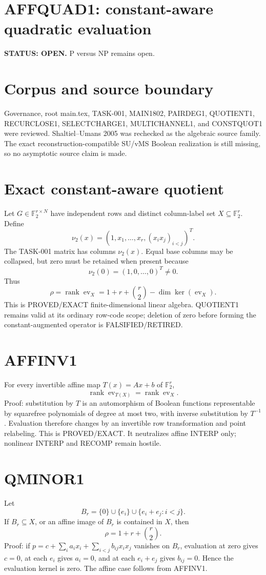 \documentclass{article}
\begin{document}
\section*{AFFQUAD1: constant-aware quadratic evaluation}
\textbf{STATUS: OPEN.} P versus NP remains open.

\section*{Corpus and source boundary}
Governance, root main.tex, TASK-001, MAIN1802, PAIRDEG1, QUOTIENT1, RECURCLOSE1, SELECTCHARGE1, MULTICHANNEL1, and CONSTQUOT1 were reviewed. Shaltiel--Umans 2005 was rechecked as the algebraic source family. The exact reconstruction-compatible SU/vMS Boolean realization is still missing, so no asymptotic source claim is made.

\section*{Exact constant-aware quotient}
Let \(G\in\mathbb F_2^{r\times N}\) have independent rows and distinct column-label set \(X\subseteq\mathbb F_2^r\). Define
\[
\nu_2(x)=(1,x_1,\ldots,x_r,(x_ix_j)_{i<j})^T.
\]
The TASK-001 matrix has columns \(\nu_2(x)\). Equal base columns may be collapsed, but zero must be retained when present because
\[
\nu_2(0)=(1,0,\ldots,0)^T\ne0.
\]
Thus
\[
\rho=\operatorname{rank}\operatorname{ev}_X
=1+r+\binom r2-\dim\ker(\operatorname{ev}_X).
\]
This is PROVED/EXACT finite-dimensional linear algebra. QUOTIENT1 remains valid at its ordinary row-code scope; deletion of zero before forming the constant-augmented operator is FALSIFIED/RETIRED.

\section*{AFFINV1}
For every invertible affine map \(T(x)=Ax+b\) of \(\mathbb F_2^r\),
\[
\boxed{\operatorname{rank}\operatorname{ev}_{T(X)}
=\operatorname{rank}\operatorname{ev}_X.}
\]
Proof: substitution by \(T\) is an automorphism of Boolean functions representable by squarefree polynomials of degree at most two, with inverse substitution by \(T^{-1}\). Evaluation therefore changes by an invertible row transformation and point relabeling. This is PROVED/EXACT. It neutralizes affine INTERP only; nonlinear INTERP and RECOMP remain hostile.

\section*{QMINOR1}
Let
\[
B_r=\{0\}\cup\{e_i\}\cup\{e_i+e_j:i<j\}.
\]
If \(B_r\subseteq X\), or an affine image of \(B_r\) is contained in \(X\), then
\[
\boxed{\rho=1+r+\binom r2.}
\]
Proof: if \(p=c+\sum_i a_ix_i+\sum_{i<j}b_{ij}x_ix_j\) vanishes on \(B_r\), evaluation at zero gives \(c=0\), at each \(e_i\) gives \(a_i=0\), and at each \(e_i+e_j\) gives \(b_{ij}=0\). Hence the evaluation kernel is zero. The affine case follows from AFFINV1.
\end{document}
